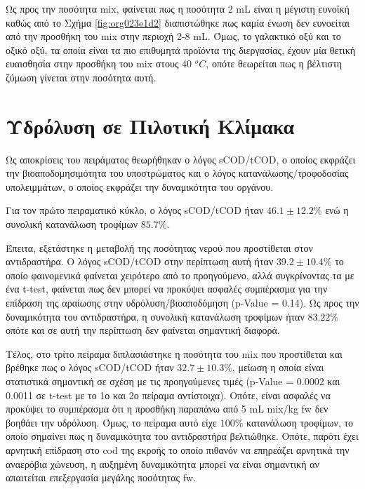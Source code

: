 \documentclass[11pt]{report}
\begin{document}
Ως προς την ποσότητα \acrshort{mix}, φαίνεται πως η ποσότητα 2 mL είναι η μέγιστη ευνοϊκή καθώς από το Σχήμα \ref{fig:org023e1d2} διαπιστώθηκε πως καμία ένωση δεν ευνοείται από την προσθήκη του \acrshort{mix} στην περιοχή 2-8 mL. Όμως, το γαλακτικό οξύ και το οξικό οξύ, τα οποία είναι τα πιο επιθυμητά προϊόντα της διεργασίας, έχουν μία θετική ευαισθησία στην προσθήκη του \acrshort{mix} στους 40 \(^oC\), οπότε θεωρείται πως η βέλτιστη ζύμωση γίνεται στην ποσότητα αυτή.

\section{Υδρόλυση σε Πιλοτική Κλίμακα}
\label{sec:org12ddae2}
Ως αποκρίσεις του πειράματος θεωρήθηκαν ο λόγος sCOD/tCOD, ο οποίος εκφράζει την βιοαποδομησιμότητα του υποστρώματος και ο λόγος κατανάλωσης/τροφοδοσίας υπολειμμάτων, ο οποίος εκφράζει την δυναμικότητα του οργάνου. 

Για τον πρώτο πειραματικό κύκλο, ο λόγος sCOD/tCOD ήταν \(46.1 \pm 12.2 \%\) ενώ η συνολική κατανάλωση τροφίμων \(85.7 \%\).

Έπειτα, εξετάστηκε η μεταβολή της ποσότητας νερού που προστίθεται στον αντιδραστήρα. Ο λόγος sCOD/tCOD στην περίπτωση αυτή ήταν \(39.2 \pm 10.4 \%\) το οποίο φαινομενικά φαίνεται χειρότερο από το προηγούμενο, αλλά συγκρίνοντας τα με ένα t-test, φαίνεται πως δεν μπορεί να προκύψει ασφαλές συμπέρασμα για την επίδραση της αραίωσης στην υδρόλυση/βιοαποδόμηση (p-Value = 0.14). Ως προς την δυναμικότητα του αντιδραστήρα, η συνολική κατανάλωση τροφίμων ήταν \(83.22 \%\) οπότε και σε αυτή την περίπτωση δεν φαίνεται σημαντική διαφορά.

Τέλος, στο τρίτο πείραμα διπλασιάστηκε η ποσότητα του \acrshort{mix} που προστίθεται και βρέθηκε πως ο λόγος sCOD/tCOD ήταν \(32.7 \pm 10.3 \%\), μείωση η οποία είναι στατιστικά σημαντική σε σχέση με τις προηγούμενες τιμές (p-Value = 0.0002 και 0.0011 σε t-test με το 1ο και 2ο πείραμα αντίστοιχα). Οπότε, είναι ασφαλές να προκύψει το συμπέρασμα ότι η προσθήκη παραπάνω από 5 mL \acrshort{mix}/kg \acrshort{fw} δεν βοηθάει την υδρόλυση. Όμως, το πείραμα αυτό είχε \(100 \%\) κατανάλωση τροφίμων, το οποίο σημαίνει πως η δυναμικότητα του αντιδραστήρα βελτιώθηκε. Οπότε, παρότι έχει αρνητική επίδραση στο \acrshort{cod} της εκροής το οποίο πιθανόν να επηρεάζει αρνητικά την αναερόβια χώνευση, η αυξημένη δυναμικότητα μπορεί να είναι σημαντική αν απαιτείται επεξεργασία μεγάλης ποσότητας \acrshort{fw}.
\end{document}
